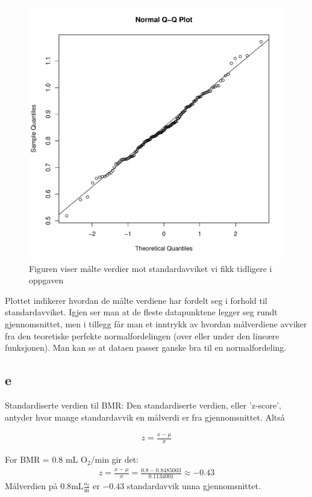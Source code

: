 \begin{figure}[H]
		\centering
		\includegraphics[width=0.9\linewidth]{Rplots.pdf}
		\caption{Figuren viser målte verdier mot standardavviket vi fikk tidligere i oppgaven}
		\label{fig:QQ}
\end{figure}
Plottet indikerer hvordan de målte verdiene har fordelt seg i forhold til standardavviket. Igjen ser man at de fleste datapunktene legger seg rundt gjennomsnittet, men i tillegg får man et inntrykk av hvordan målverdiene avviker fra den teoretiske perfekte normalfordelingen (over eller under den lineære funksjonen). Man kan se at dataen passer ganske bra til en normalfordeling.

\subsection*{e}

Standardiserte verdien til BMR:
Den standardiserte verdien, eller 'z-score', antyder hvor mange standardavvik en målverdi er fra gjennomsnittet. Altså

\begin{align*}
    z = \frac{x - \mu}{\sigma}
\end{align*}

For BMR = 0.8 mL O$_2$/min gir det:
\begin{align*}
    z = \frac{x - \mu}{\sigma} = \frac{0.8 - 0.8485003}{0.1134001} \approx -0.43
\end{align*}
Målverdien på $0.8\mathrm{mL}\frac{o_2}{\mathrm{m}}$ er $-0.43$ standardavvik unna gjennomsnittet.

